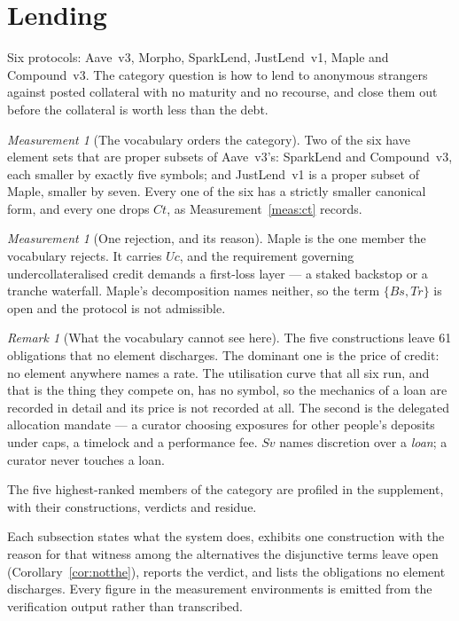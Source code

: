 \documentclass[11pt,reqno]{amsart}
\theoremstyle{plain}
\theoremstyle{definition}
\theoremstyle{remark}
\newtheorem{measurement}[theorem]{Measurement}
\newtheorem{remark}[theorem]{Remark}
\begin{document}
\section{Lending}\label{sec:cat:lend}

Six protocols: Aave~v3, Morpho, SparkLend, JustLend~v1, Maple and Compound~v3.
The category question is how to lend to anonymous strangers against posted
collateral with no maturity and no recourse, and close them out before the
collateral is worth less than the debt.

\begin{measurement}[The vocabulary orders the category]\label{meas:cat:lendorder}
Two of the six have element sets that are proper subsets of Aave~v3's:
SparkLend and Compound~v3, each smaller by exactly five symbols; and JustLend~v1
is a proper subset of Maple, smaller by seven. Every one of the six has a
strictly smaller canonical form, and every one drops $Ct$, as
Measurement~\ref{meas:ct} records.
\end{measurement}

\begin{measurement}[One rejection, and its reason]\label{meas:cat:lendrej}
Maple is the one member the vocabulary rejects. It carries $Uc$, and the
requirement governing undercollateralised credit demands a first-loss layer
--- a staked backstop or a tranche waterfall. Maple's decomposition names
neither, so the term $\{Bs, Tr\}$ is open and the protocol is not admissible.
\end{measurement}

\begin{remark}[What the vocabulary cannot see here]
The five constructions leave 61 obligations that no element discharges. The dominant one is the price of credit: no element
anywhere names a rate. The utilisation curve that all six run, and that is the
thing they compete on, has no symbol, so the mechanics of a loan are recorded in
detail and its price is not recorded at all. The second is the delegated
allocation mandate --- a curator choosing exposures for other people's deposits
under caps, a timelock and a performance fee. $Sv$ names discretion over a
\emph{loan}; a curator never touches a loan.
\end{remark}

The five highest-ranked members of the category are profiled in the
supplement, with their constructions, verdicts and residue.

Each
subsection states what the system does, exhibits one construction with the
reason for that witness among the alternatives the disjunctive terms leave open
(Corollary~\ref{cor:notthe}), reports the verdict, and lists the obligations no
element discharges. Every figure in the measurement environments is emitted from
the verification output rather than transcribed.
\end{document}
